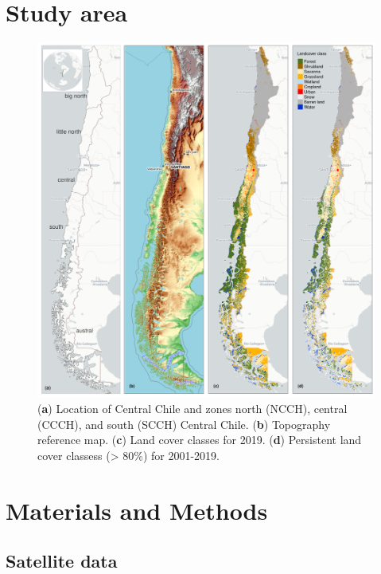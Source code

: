 \documentclass[preprint,
3p]{elsarticle} %
\begin{document}
\hypertarget{study-area}{%
\section{Study area}\label{study-area}}

\begin{figure}[H]
\centering
\includegraphics[width=\textwidth]{../output/figs/map_study_con_landcover.png}
\caption{ (\textbf{a}) Location of Central Chile and zones north (NCCH), central (CCCH), and south (SCCH) Central Chile. (\textbf{b}) Topography reference map. (\textbf{c}) Land cover classes for 2019. (\textbf{d}) Persistent land cover classess (> 80\%) for 2001-2019.}
\end{figure}

\hypertarget{materials-and-methods}{%
\section{Materials and Methods}\label{materials-and-methods}}

\hypertarget{satellite-data}{%
\subsection{Satellite data}\label{satellite-data}}
\end{document}
